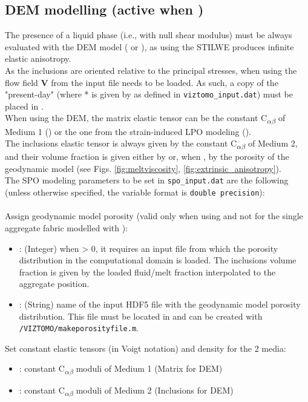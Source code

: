 \subsection{DEM modelling (active when )}
The presence of a liquid phase (i.e., with null shear modulus) must be always evaluated with the DEM model ( or ), as using the STILWE produces infinite elastic anisotropy.\\
As the inclusions are oriented relative to the principal stresses, when using \viztomotitle{} the flow field \textbf{V} from the input \vtptitle{} file needs to be loaded. As such, a copy of the "present-day" \vtptitle{} (where * is given by  as defined in \texttt{viztomo\_input.dat}) must be placed in .\\
When using the DEM, the matrix elastic tensor can be the constant C\textsubscript{$\alpha\beta$} of Medium 1 () or the one from the \drexmtitle{} strain-induced LPO modeling (). \\
The inclusions elastic tensor is always given by the constant C\textsubscript{$\alpha\beta$} of Medium 2, and their volume fraction is given either by  or, when , by the porosity of the geodynamic model (see Figs. \ref{fig:meltviscosity}, \ref{fig:extrinsic_anisotropy}). \\
The SPO modeling parameters to be set in \texttt{spo\_input.dat} are the following (unless otherwise specified, the variable format is \texttt{double precision}):\\
\\
Assign geodynamic model porosity (valid only when using \viztomotitle{} and not for the single aggregate fabric modelled with \drexstitle):
\begin{itemize}
    \item {}: (Integer) when > 0, it requires an input file from which the porosity distribution in the computational domain is loaded. The inclusions volume fraction is given by the loaded fluid/melt fraction interpolated to the aggregate position.
    \item {}: (String) name of the input HDF5 file with the geodynamic model porosity distribution. This file must be located in  and can be created with \texttt{/VIZTOMO/makeporosityfile.m}.
\end{itemize}
Set constant elastic tensors (in Voigt notation) and density for the 2 media:
\begin{itemize}
    \item {}: constant C\textsubscript{$\alpha\beta$} moduli of Medium 1 (Matrix for DEM)
    \item {}: constant C\textsubscript{$\alpha\beta$} moduli of Medium 2 (Inclusions for DEM)
\end{itemize}

